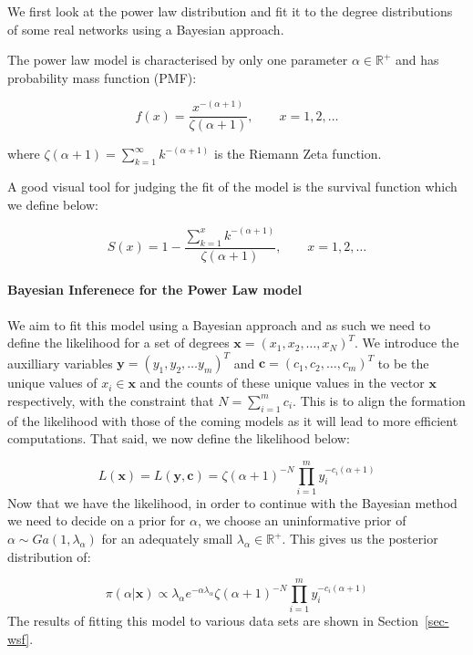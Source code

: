\documentclass[
]{article}
\let\oldparagraph\paragraph
\renewcommand{\paragraph}[1]{\oldparagraph{#1}\mbox{}}
\begin{document}
We first look at the power law distribution and fit it to the degree
distributions of some real networks using a Bayesian approach.

The power law model is characterised by only one parameter
\(\alpha\in\mathbb{R}^+\) and has probability mass function (PMF):

\[
f(x) = \frac{x^{-(\alpha+1)}}{\zeta(\alpha+1)}, \qquad x=1,2,\ldots
\]

where \(\zeta(\alpha+1) = \sum_{k=1}^\infty k^{-(\alpha+1)}\) is the
Riemann Zeta function.

A good visual tool for judging the fit of the model is the survival
function which we define below:

\[
S(x) = 1 - \frac{\sum_{k=1}^x k^{-(\alpha+1)}}{\zeta(\alpha+1)}, \qquad x=1,2,\ldots
\]

\hypertarget{bayesian-inferenece-for-the-power-law-model}{%
\paragraph{Bayesian Inferenece for the Power Law
model}\label{bayesian-inferenece-for-the-power-law-model}}

We aim to fit this model using a Bayesian approach and as such we need
to define the likelihood for a set of degrees
\(\boldsymbol{x} = (x_1, x_2, \ldots, x_N)^T\). We introduce the
auxilliary variables \(\boldsymbol{y} = (y_1, y_2, \ldots y_m)^T\) and
\(\boldsymbol{c} = (c_1, c_2, \ldots,c_m)^T\) to be the unique values of
\(x_i \in \boldsymbol{x}\) and the counts of these unique values in the
vector \(\boldsymbol{x}\) respectively, with the constraint that
\(N = \sum_{i=1}^m c_i\). This is to align the formation of the
likelihood with those of the coming models as it will lead to more
efficient computations. That said, we now define the likelihood below:

\[
L(\boldsymbol{x}) = L(\boldsymbol{y},\boldsymbol{c}) =  \zeta(\alpha+1)^{-N}\prod_{i=1}^m y_i^{-c_i(\alpha+1)}
\] Now that we have the likelihood, in order to continue with the
Bayesian method we need to decide on a prior for \(\alpha\), we choose
an uninformative prior of \(\alpha\sim Ga(1,\lambda_\alpha)\) for an
adequately small \(\lambda_\alpha\in\mathbb{R^+}\). This gives us the
posterior distribution of:

\[
\pi(\alpha|\boldsymbol{x}) \propto \lambda_\alpha e^{-\alpha\lambda_\alpha}\zeta(\alpha+1)^{-N}\prod_{i=1}^m y_i^{-c_i(\alpha+1)}
\] The results of fitting this model to various data sets are shown in
Section~\ref{sec-wsf}.
\end{document}
